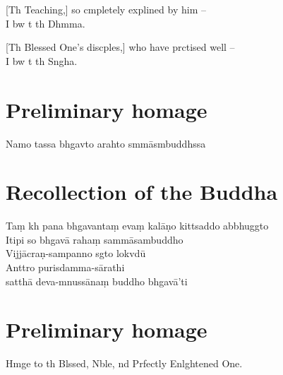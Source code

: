 [Th Teaching,] so cmpletely explined by him --\\
I bw t th Dhmma. 

[Th Blessed One's discples,] who have prctised well --\\
I bw t th Sngha. 

\clearpage

\chapter{Preliminary homage}%

\begin{leader}
\end{leader}

Namo tassa bhgavto arahto smmāsmbuddhssa


\chapter{Recollection of the Buddha}%

\begin{leader}
\end{leader}

Taṃ kh pana bhgavantaṃ evaṃ kalāṇo kittsaddo abbhuggto\\
Itipi so bhgavā rahaṃ sammāsambuddho\\
Vijjācraṇ-sampanno sgto lokvdū\\
Anttro purisdamma-sārathi\\
\vin satthā deva-mnussānaṃ buddho bhgavā'ti

\clearpage

\chapter{Preliminary homage}%

\begin{leader}
\end{leader}

Hmge to th Blssed, Nble, nd Prfectly Enlghtened One.

